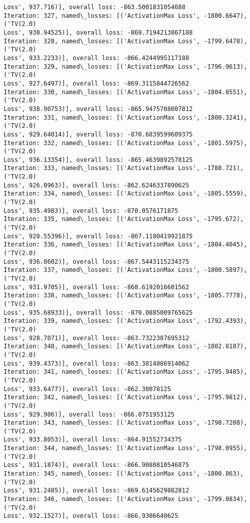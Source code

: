 \documentclass[10pt]{article}
\begin{document}
\begin{Verbatim}[commandchars=\\\{\}]
Loss', 937.716)], overall loss: -863.5001831054688
Iteration: 327, named\_losses: [('ActivationMax Loss', -1800.6647), ('TV(2.0)
Loss', 930.94525)], overall loss: -869.7194213867188
Iteration: 328, named\_losses: [('ActivationMax Loss', -1799.6478), ('TV(2.0)
Loss', 933.2233)], overall loss: -866.4244995117188
Iteration: 329, named\_losses: [('ActivationMax Loss', -1796.9613), ('TV(2.0)
Loss', 927.6497)], overall loss: -869.3115844726562
Iteration: 330, named\_losses: [('ActivationMax Loss', -1804.8551), ('TV(2.0)
Loss', 938.90753)], overall loss: -865.9475708007812
Iteration: 331, named\_losses: [('ActivationMax Loss', -1800.3241), ('TV(2.0)
Loss', 929.64014)], overall loss: -870.6839599609375
Iteration: 332, named\_losses: [('ActivationMax Loss', -1801.5975), ('TV(2.0)
Loss', 936.13354)], overall loss: -865.4639892578125
Iteration: 333, named\_losses: [('ActivationMax Loss', -1788.721), ('TV(2.0)
Loss', 926.0963)], overall loss: -862.6246337890625
Iteration: 334, named\_losses: [('ActivationMax Loss', -1805.5559), ('TV(2.0)
Loss', 935.4983)], overall loss: -870.0576171875
Iteration: 335, named\_losses: [('ActivationMax Loss', -1795.672), ('TV(2.0)
Loss', 928.55396)], overall loss: -867.1180419921875
Iteration: 336, named\_losses: [('ActivationMax Loss', -1804.4045), ('TV(2.0)
Loss', 936.8602)], overall loss: -867.5443115234375
Iteration: 337, named\_losses: [('ActivationMax Loss', -1800.5897), ('TV(2.0)
Loss', 931.9705)], overall loss: -868.6192016601562
Iteration: 338, named\_losses: [('ActivationMax Loss', -1805.7778), ('TV(2.0)
Loss', 935.68933)], overall loss: -870.0885009765625
Iteration: 339, named\_losses: [('ActivationMax Loss', -1792.4393), ('TV(2.0)
Loss', 928.7071)], overall loss: -863.7322387695312
Iteration: 340, named\_losses: [('ActivationMax Loss', -1802.8187), ('TV(2.0)
Loss', 939.4373)], overall loss: -863.3814086914062
Iteration: 341, named\_losses: [('ActivationMax Loss', -1795.9485), ('TV(2.0)
Loss', 933.6477)], overall loss: -862.30078125
Iteration: 342, named\_losses: [('ActivationMax Loss', -1795.9812), ('TV(2.0)
Loss', 929.906)], overall loss: -866.0751953125
Iteration: 343, named\_losses: [('ActivationMax Loss', -1798.7208), ('TV(2.0)
Loss', 933.8053)], overall loss: -864.91552734375
Iteration: 344, named\_losses: [('ActivationMax Loss', -1798.0955), ('TV(2.0)
Loss', 931.1874)], overall loss: -866.9080810546875
Iteration: 345, named\_losses: [('ActivationMax Loss', -1800.863), ('TV(2.0)
Loss', 931.2485)], overall loss: -869.6145629882812
Iteration: 346, named\_losses: [('ActivationMax Loss', -1799.0834), ('TV(2.0)
Loss', 932.1527)], overall loss: -866.9306640625

\end{Verbatim}
\end{document}
